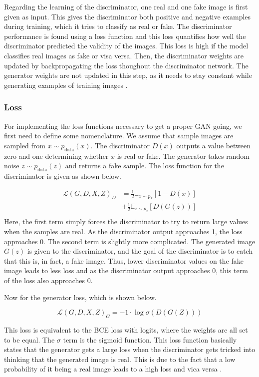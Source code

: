 \documentclass[12pt, fleqn, titlepage]{article}
\newcommand{\1}[1]{\mathds{1}\left[#1\right]}
\begin{document}
Regarding the learning of the discriminator, one real and one fake image is first given as input. This gives the discriminator both positive and negative examples during training, which it tries to classify as real or fake. The discriminator performance is found using a loss function and this loss quantifies how well the discriminator predicted the validity of the images. This loss is high if the model classifies real images as fake or visa versa. Then, the discriminator weights are updated by backpropagating the loss thoughout the discriminator network. The generator weights are not updated in this step, as it needs to stay constant while generating examples of training images \cite{developers.google_discriminator, developers.google_training}.

\subsubsection{Loss}
For implementing the loss functions necessary to get a proper GAN going, we first need to define some nomenclature. We assume that sample images are sampled from $x \sim p_{\text {data}}(x)$. The discriminator $D(x)$ outputs a value between zero and one determining whether $x$ is real or fake. The generator takes random noise $z \sim p_{\text {data}}(z)$ and returns a fake sample. The loss function for the discriminator is given as shown below.

\[\begin{aligned}
	\mathcal{L}\left(G, D, X, Z\right)_D &=\frac{1}{2} \mathbb{E}_{x \sim p_{x}}[1-D(x)] \\
	&+\frac{1}{2} \mathbb{E}_{z \sim p_{z}}[D(G(z))] \\
\end{aligned}\]
Here, the first term simply forces the discriminator to try to return large values when the samples are real. As the discriminator output approaches 1, the loss approaches 0. The second term is slightly more complicated. The generated image $G(z)$ is given to the discriminator, and the goal of the discriminator is to catch that this is, in fact, a fake image. Thus, lower discriminator values on the fake image leads to less loss and as the discriminator output approaches 0, this term of the loss also approaches 0.

Now for the generator loss, which is shown below.

\[\mathcal{L}\left(G, D, X, Z\right)_G=-1 \cdot \log \sigma\left(D(G(Z))\right)\]

This loss is equivalent to the BCE loss with logits, where the weights are all set to be equal. The $\sigma$ term is the sigmoid function. This loss function basically states that the generator gets a large loss when the discriminator gets tricked into thinking that the generated image is real. This is due to the fact that a low probability of it being a real image leads to a high loss and vica versa \cite{bcewithlogits}.
\end{document}
